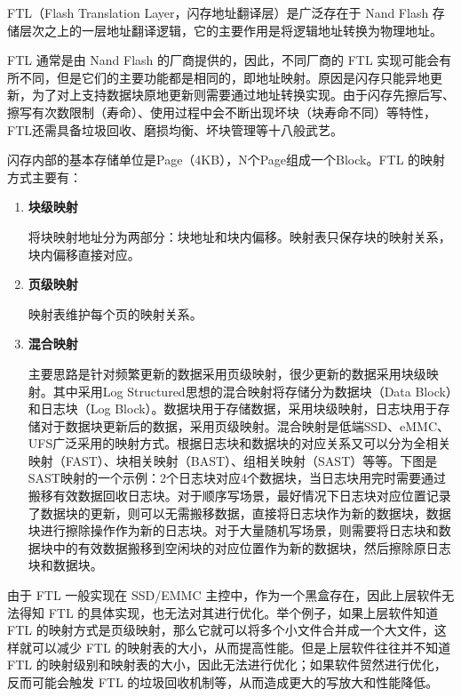 FTL（Flash Translation Layer，闪存地址翻译层）是广泛存在于 Nand Flash 存储层次之上的一层地址翻译逻辑，它的主要作用是将逻辑地址转换为物理地址。

FTL 通常是由 Nand Flash 的厂商提供的，因此，不同厂商的 FTL 实现可能会有所不同，但是它们的主要功能都是相同的，即地址映射。原因是闪存只能异地更新，为了对上支持数据块原地更新则需要通过地址转换实现。由于闪存先擦后写、擦写有次数限制（寿命）、使用过程中会不断出现坏块（块寿命不同）等特性，FTL还需具备垃圾回收、磨损均衡、坏块管理等十八般武艺。

闪存内部的基本存储单位是Page（4KB），N个Page组成一个Block。FTL 的映射方式主要有：

\begin{enumerate}

  \item \textbf{块级映射}

  将块映射地址分为两部分：块地址和块内偏移。映射表只保存块的映射关系，块内偏移直接对应。

  \item \textbf{页级映射}

  映射表维护每个页的映射关系。

  \item \textbf{混合映射}

  主要思路是针对频繁更新的数据采用页级映射，很少更新的数据采用块级映射。其中采用Log Structured思想的混合映射将存储分为数据块（Data Block）和日志块（Log Block）。数据块用于存储数据，采用块级映射，日志块用于存储对于数据块更新后的数据，采用页级映射。混合映射是低端SSD、eMMC、UFS广泛采用的映射方式。根据日志块和数据块的对应关系又可以分为全相关映射（FAST）、块相关映射（BAST）、组相关映射（SAST）等等。下图是SAST映射的一个示例：2个日志块对应4个数据块，当日志块用完时需要通过搬移有效数据回收日志块。对于顺序写场景，最好情况下日志块对应位置记录了数据块的更新，则可以无需搬移数据，直接将日志块作为新的数据块，数据块进行擦除操作作为新的日志块。对于大量随机写场景，则需要将日志块和数据块中的有效数据搬移到空闲块的对应位置作为新的数据块，然后擦除原日志块和数据块。

\end{enumerate}

由于 FTL 一般实现在 SSD/EMMC 主控中，作为一个黑盒存在，因此上层软件无法得知 FTL 的具体实现，也无法对其进行优化。举个例子，如果上层软件知道 FTL 的映射方式是页级映射，那么它就可以将多个小文件合并成一个大文件，这样就可以减少 FTL 的映射表的大小，从而提高性能。但是上层软件往往并不知道 FTL 的映射级别和映射表的大小，因此无法进行优化；如果软件贸然进行优化，反而可能会触发 FTL 的垃圾回收机制等，从而造成更大的写放大和性能降低。

